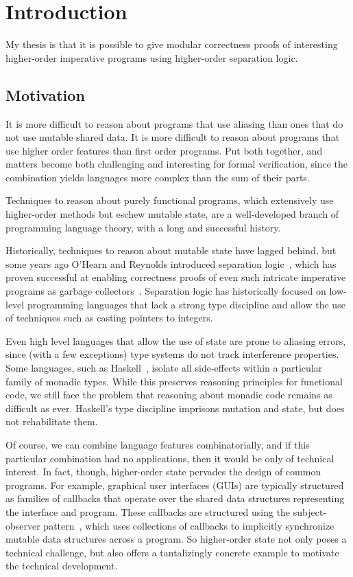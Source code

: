 \chapter{Introduction}

My thesis is that it is possible to give modular correctness proofs of
interesting higher-order imperative programs using higher-order
separation logic.

\section{Motivation}

It is more difficult to reason about programs that use aliasing than
ones that do not use mutable shared data. It is more difficult to
reason about programs that use higher order features than first order
programs. Put both together, and matters become both challenging and
interesting for formal verification, since the combination yields
languages more complex than the sum of their parts. 

Techniques to reason about purely functional programs, which
extensively use higher-order methods but eschew mutable state, are a
well-developed branch of programming language theory, with a
long and successful history.

Historically, techniques to reason about mutable state have lagged
behind, but some years ago O'Hearn and Reynolds introduced separation
logic~\citep{sep-logic}, which has proven successful at enabling
correctness proofs of even such intricate imperative programs as
garbage collectors~\citep{gc-proof}. Separation logic has historically
focused on low-level programming languages that lack a strong type
discipline and allow the use of techniques such as casting pointers to
integers.

Even high level languages that allow the use of state are prone to
aliasing errors, since (with a few exceptions) type systems do not
track interference properties. Some languages, such as
Haskell~\cite{haskell-report}, isolate all side-effects within a
particular family of monadic types. While this preserves reasoning
principles for functional code, we still face the problem that
reasoning about monadic code remains as difficult as ever. Haskell's
type discipline imprisons mutation and state, but does not
rehabilitate them.

Of course, we can combine language features combinatorially, and if
this particular combination had no applications, then it would be only
of technical interest. In fact, though, higher-order state pervades
the design of common programs. For example, graphical user interfaces
(GUIs) are typically structured as families of callbacks that operate
over the shared data structures representing the interface and
program. These callbacks are structured using the subject-observer
pattern~\cite{gof}, which uses collections of callbacks to implicitly
synchronize mutable data structures across a program. So higher-order
state not only poses a technical challenge, but also offers a
tantalizingly concrete example to motivate the technical development.

